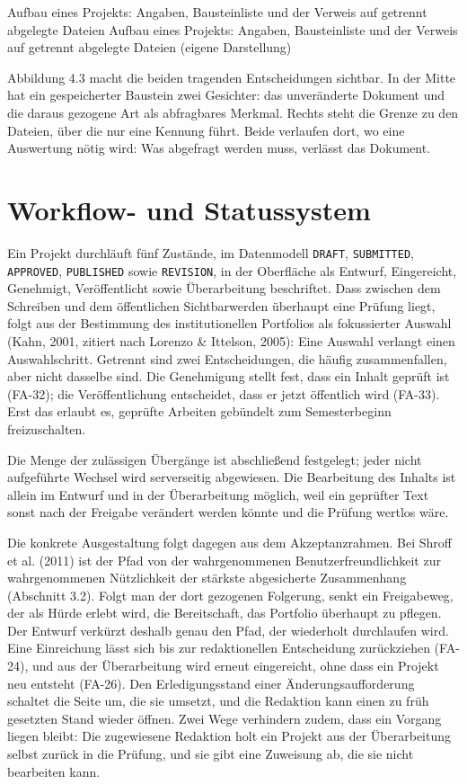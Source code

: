 %
{Aufbau eines Projekts: Angaben, Bausteinliste und der Verweis auf getrennt abgelegte Dateien}%
{Aufbau eines Projekts: Angaben, Bausteinliste und der Verweis auf getrennt abgelegte Dateien (eigene Darstellung)}

Abbildung 4.3 macht die beiden tragenden Entscheidungen sichtbar. In der Mitte hat ein gespeicherter Baustein zwei Gesichter: das unveränderte Dokument und die daraus gezogene Art als abfragbares Merkmal. Rechts steht die Grenze zu den Dateien, über die nur eine Kennung führt. Beide verlaufen dort, wo eine Auswertung nötig wird: Was abgefragt werden muss, verlässt das Dokument.

\section{Workflow- und Statussystem}
\label{sec:workflow}

Ein Projekt durchläuft fünf Zustände, im Datenmodell \texttt{DRAFT}, \texttt{SUBMITTED}, \texttt{APPROVED}, \texttt{PUBLISHED} sowie \texttt{REVISION}, in der Oberfläche als Entwurf, Eingereicht, Genehmigt, Veröffentlicht sowie Überarbeitung beschriftet. Dass zwischen dem Schreiben und dem öffentlichen Sichtbarwerden überhaupt eine Prüfung liegt, folgt aus der Bestimmung des institutionellen Portfolios als fokussierter Auswahl (Kahn, 2001, zitiert nach Lorenzo \& Ittelson, 2005): Eine Auswahl verlangt einen Auswahlschritt. Getrennt sind zwei Entscheidungen, die häufig zusammenfallen, aber nicht dasselbe sind. Die Genehmigung stellt fest, dass ein Inhalt geprüft ist (FA-32); die Veröffentlichung entscheidet, dass er jetzt öffentlich wird (FA-33). Erst das erlaubt es, geprüfte Arbeiten gebündelt zum Semesterbeginn freizuschalten.

Die Menge der zulässigen Übergänge ist abschließend festgelegt; jeder nicht aufgeführte Wechsel wird serverseitig abgewiesen. Die Bearbeitung des Inhalts ist allein im Entwurf und in der Überarbeitung möglich, weil ein geprüfter Text sonst nach der Freigabe verändert werden könnte und die Prüfung wertlos wäre.

Die konkrete Ausgestaltung folgt dagegen aus dem Akzeptanzrahmen. Bei Shroff et al. (2011) ist der Pfad von der wahrgenommenen Benutzerfreundlichkeit zur wahrgenommenen Nützlichkeit der stärkste abgesicherte Zusammenhang (Abschnitt 3.2). Folgt man der dort gezogenen Folgerung, senkt ein Freigabeweg, der als Hürde erlebt wird, die Bereitschaft, das Portfolio überhaupt zu pflegen. Der Entwurf verkürzt deshalb genau den Pfad, der wiederholt durchlaufen wird. Eine Einreichung lässt sich bis zur redaktionellen Entscheidung zurückziehen (FA-24), und aus der Überarbeitung wird erneut eingereicht, ohne dass ein Projekt neu entsteht (FA-26). Den Erledigungsstand einer Änderungsaufforderung schaltet die Seite um, die sie umsetzt, und die Redaktion kann einen zu früh gesetzten Stand wieder öffnen. Zwei Wege verhindern zudem, dass ein Vorgang liegen bleibt: Die zugewiesene Redaktion holt ein Projekt aus der Überarbeitung selbst zurück in die Prüfung, und sie gibt eine Zuweisung ab, die sie nicht bearbeiten kann.

